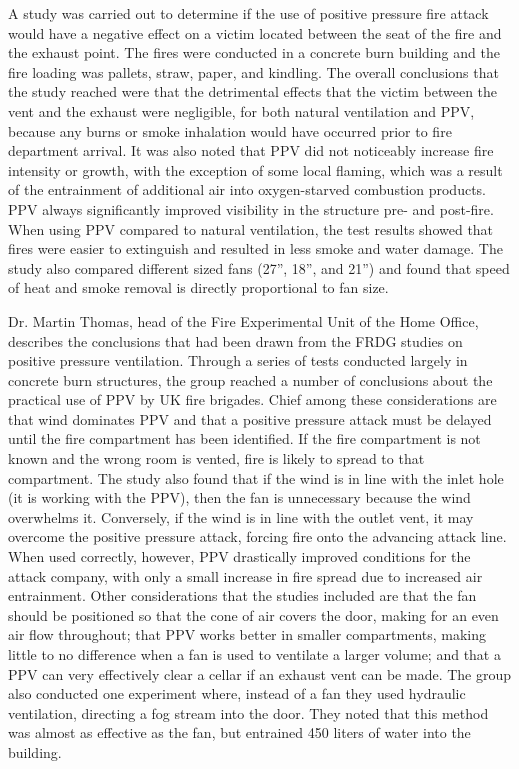 \documentclass{article}
\begin{document}
\begin{appendices}
A study was carried out to determine if the use of positive pressure fire attack would have a negative effect on a victim located between the seat of the fire and the exhaust point. The fires were conducted in a concrete burn building and the fire loading was pallets, straw, paper, and kindling. The overall conclusions that the study reached were that the detrimental effects that the victim between the vent and the exhaust were negligible, for both natural ventilation and PPV, because any burns or smoke inhalation would have occurred prior to fire department arrival. It was also noted that PPV did not noticeably increase fire intensity or growth, with the exception of some local flaming, which was a result of the entrainment of additional air into oxygen-starved combustion products. PPV always significantly improved visibility in the structure pre- and post-fire. When using PPV compared to natural ventilation, the test results showed that fires were easier to extinguish and resulted in less smoke and water damage. The study also compared different sized fans (27”, 18”, and 21”) and found that speed of heat and smoke removal is directly proportional to fan size.\cite{BowserFireServiceCollege}
	
Dr. Martin Thomas, head of the Fire Experimental Unit of the Home Office, describes the conclusions that had been drawn from the FRDG studies on positive pressure ventilation. Through a series of tests conducted largely in concrete burn structures, the group reached a number of conclusions about the practical use of PPV by UK fire brigades. Chief among these considerations are that wind dominates PPV and that a positive pressure attack must be delayed until the fire compartment has been identified. If the fire compartment is not known and the wrong room is vented, fire is likely to spread to that compartment. The study also found that if the wind is in line with the inlet hole (it is working with the PPV), then the fan is unnecessary because the wind overwhelms it. Conversely, if the wind is in line with the outlet vent, it may overcome the positive pressure attack, forcing fire onto the advancing attack line. When used correctly, however, PPV drastically improved conditions for the attack company, with only a small increase in fire spread due to increased air entrainment. Other considerations that the studies included are that the fan should be positioned so that the cone of air covers the door, making for an even air flow throughout; that PPV works better in smaller compartments, making little to no difference when a fan is used to ventilate a larger volume; and that a PPV can very effectively clear a cellar if an exhaust vent can be made. The group also conducted one experiment where, instead of a fan they used hydraulic ventilation, directing a fog stream into the door. They noted that this method was almost as effective as the fan, but entrained 450 liters of water into the building.\cite{HomeOfficeRes}
	

\end{appendices}
\end{document}
